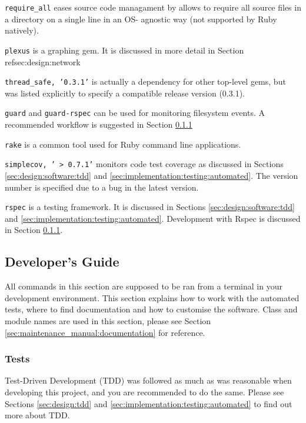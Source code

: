 \texttt{require\_all} \parencite{Require+all} eases source code managament by
allows to require all source files in a directory on a single line in an OS-
agnostic way (not supported by Ruby natively).

\texttt{plexus} \parencite{Plexus} is a graphing gem. It is discussed in more
detail in Section ref{sec:design:network}

\texttt{thread\_safe, '0.3.1'} is actually a dependency for other top-level
gems, but was listed explicitly to specify a compatible release version
(0.3.1).

\texttt{guard} and \texttt{guard-rspec} \parencite{Guard} can be used for
monitoring filesystem events. A recommended workflow is suggested in Section
\ref{sec:maintenance_manual:testing}

\texttt{rake} \parencite{Rake} is a common tool used for Ruby command line
applications.

\texttt{simplecov, '~> 0.7.1'} \parencite{Simplecov} monitors code test
coverage as discussed in Sections \ref{sec:design:software:tdd} and
\ref{sec:implementation:testing:automated}. The version number is specified due
to a bug in the latest version.

\texttt{rspec} \parencite{Rspec} is a testing framework. It is discussed in
Sections \ref{sec:design:software:tdd} and
\ref{sec:implementation:testing:automated}. Development with Rspec is discussed
in Section \ref{sec:maintenance_manual:testing}.


\subsection{Developer's Guide}
\label{sec:maintenance_manual:developing}

All commands in this section are supposed to be ran from a terminal in your
development environment. This section explains how to work with the automated
tests, where to find documentation and how to customise the software. Class and
module names are used in this section, please see Section
\ref{sec:maintenance_manual:documentation} for reference.


\subsubsection{Tests}

\label{sec:maintenance_manual:testing}

Test-Driven Development (TDD) was followed as much as was reasonable when
developing this project, and you are recommended to do the same. Please see
Sections \ref{sec:design:tdd} and \ref{sec:implementation:testing:automated} to
find out more about TDD.

